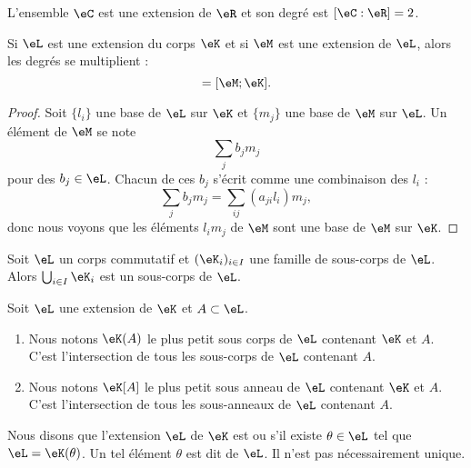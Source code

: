 \begin{example}
    L'ensemble \( \eC\) est une extension de \( \eR\) et son degré est \( [\eC:\eR]=2\).
\end{example}

\begin{proposition}     \label{PropGWazMpY}
    Si \( \eL\) est une extension du corps \( \eK\) et si \( \eM\) est une extension de \( \eL\), alors les degrés se multiplient :
    \begin{equation}
        [\eM:\eL][\eL:\eK]=[\eM;\eK].
    \end{equation}
\end{proposition}

\begin{proof}
    Soit \( \{ l_i \}\) une base de \( \eL\) sur \( \eK\) et \( \{ m_j \}\) une base de \( \eM\) sur \( \eL\). Un élément de \( \eM\) se note
    \begin{equation}
        \sum_{j}b_jm_j
    \end{equation}
    pour des \( b_j\in \eL\). Chacun de ces \( b_j\) s'écrit comme une combinaison des \( l_i\) :
    \begin{equation}
        \sum_{j}b_jm_j=\sum_{ij}(a_{ji}l_i)m_j,
    \end{equation}
    donc nous voyons que les éléments \( l_im_j\) de \( \eM\) sont une base de \( \eM\) sur \( \eK\).
\end{proof}

\begin{lemma}
    Soit \( \eL\) un corps commutatif et \( (\eK_i)_{i\in I}\) une famille de sous-corps de \( \eL\). Alors \( \bigcup_{i\in I}\eK_i\) est un sous-corps de \( \eL\).
\end{lemma}

\begin{definition}  \label{DefZCYIbve}
    Soit \( \eL\) une extension de \( \eK\) et \( A\subset \eL\). 
    \begin{enumerate}
        \item
            
    Nous notons \( \eK(A)\) le plus petit sous corps de \( \eL\) contenant \( \eK\) et \( A\). C'est l'intersection de tous les sous-corps de \( \eL\) contenant \( A\).
\item
    Nous notons \( \eK[A]\) le plus petit sous anneau de \( \eL\) contenant \( \eK\) et \( A\). C'est l'intersection de tous les sous-anneaux de \( \eL\) contenant \( A\).
    \end{enumerate}
    Nous disons que l'extension \( \eL\) de \( \eK\) est  ou  s'il existe \( \theta\in\eL\) tel que \( \eL=\eK(\theta)\). Un tel élément \( \theta\) est dit  de \( \eL\). Il n'est pas nécessairement unique.
\end{definition}

